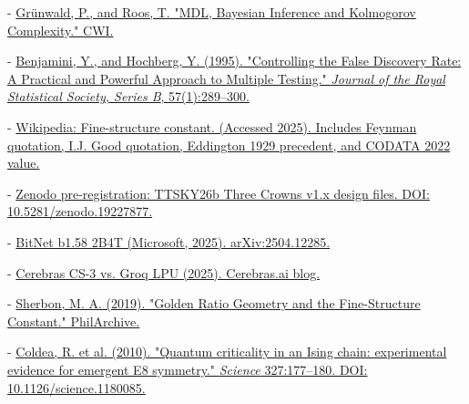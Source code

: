 - \href{https://homepages.cwi.nl/~paulv/papers/mdlindbayeskolmcompl.pdf}{Grünwald, P., and Roos, T. "MDL, Bayesian Inference and Kolmogorov Complexity." CWI.}

- \href{https://www.jstor.org/stable/2346101}{Benjamini, Y., and Hochberg, Y. (1995). "Controlling the False Discovery Rate: A Practical and Powerful Approach to Multiple Testing." \textit{Journal of the Royal Statistical Society, Series B}, 57(1):289--300.}

- \href{https://en.wikipedia.org/wiki/Fine-structure\_constant}{Wikipedia: Fine-structure constant. (Accessed 2025). Includes Feynman quotation, I.J. Good quotation, Eddington 1929 precedent, and CODATA 2022 value.}

- \href{https://doi.org/10.5281/zenodo.19227877}{Zenodo pre-registration: TTSKY26b Three Crowns v1.x design files. DOI: 10.5281/zenodo.19227877.}

- \href{https://arxiv.org/abs/2504.12285}{BitNet b1.58 2B4T (Microsoft, 2025). arXiv:2504.12285.}

- \href{https://www.cerebras.ai/blog/cerebras-cs-3-vs-groq-lpu}{Cerebras CS-3 vs. Groq LPU (2025). Cerebras.ai blog.}

- \href{https://philarchive.org/rec/SHEGRG}{Sherbon, M. A. (2019). "Golden Ratio Geometry and the Fine-Structure Constant." PhilArchive.}

- \href{https://doi.org/10.1126/science.1180085}{Coldea, R. et al. (2010). "Quantum criticality in an Ising chain: experimental evidence for emergent E8 symmetry." \textit{Science} 327:177--180. DOI: 10.1126/science.1180085.}
